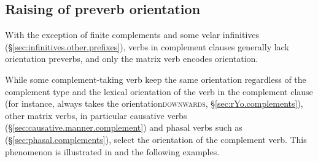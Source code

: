 \subsection{Raising of preverb orientation} \label{sec:orientation.raising}
With the exception of finite complements and some velar infinitives (§\ref{sec:infinitives.other.prefixes}), verbs in complement clauses generally lack orientation preverbs, and only the matrix verb encodes orientation.

While some complement-taking verb keep the same orientation regardless of the complement type and the lexical orientation of the verb in the complement clause (for instance,  always takes the orientation\textsc{downwards}, §\ref{sec:rYo.complements}), other matrix verbs, in particular causative verbs (§\ref{sec:causative.manner.complement}) and phasal verbs such as    (§\ref{sec:phasal.complements}), select the orientation of the complement verb. This phenomenon is illustrated in  and the following examples.


